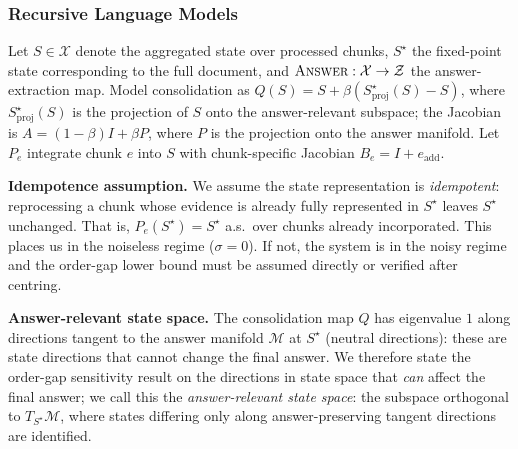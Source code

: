 \documentclass[12pt,a4paper]{article}
\newcommand{\X}{\mathcal{X}}
\newcommand{\Z}{\mathcal{Z}}
\begin{document}
\subsubsection*{Recursive Language Models}

Let $S \in \X$ denote the aggregated state over processed chunks, $S^\star$
the fixed-point state corresponding to the full document, and
$\textsc{Answer} : \X \to \Z$ the answer-extraction map. Model consolidation as
$Q(S) = S + \beta(S^\star_{\textrm{proj}}(S) - S)$,
where $S^\star_{\textrm{proj}}(S)$ is the projection of $S$ onto the
answer-relevant subspace; the Jacobian is $A = (1 - \beta) I + \beta P$, where
$P$ is the projection onto the answer manifold. Let $P_e$ integrate chunk $e$
into $S$ with chunk-specific Jacobian $B_e = I + e_{\textrm{add}}$.

\textbf{Idempotence assumption.}
We assume the state representation is \emph{idempotent}: reprocessing a chunk
whose evidence is already fully represented in $S^\star$ leaves $S^\star$
unchanged. That is, $P_e(S^\star) = S^\star$ a.s.\ over chunks already
incorporated. This places us in the noiseless regime ($\sigma = 0$). If not,
the system is in the noisy regime and the order-gap lower bound must be assumed directly or verified
after centring.

\textbf{Answer-relevant state space.}
The consolidation map $Q$ has eigenvalue $1$ along directions tangent to
the answer manifold $\mathcal{M}$ at $S^\star$ (neutral directions): these
are state directions that cannot change the final answer. We therefore state
the order-gap sensitivity result on the directions in state space that
\emph{can} affect the final answer; we call this the \emph{answer-relevant
state space}: the subspace orthogonal to $T_{S^\star}\mathcal{M}$, where states
differing only along answer-preserving tangent directions are identified.
\end{document}
